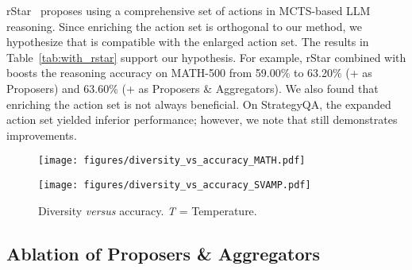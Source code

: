 rStar~\cite{qi2024mutual} proposes using a comprehensive set of actions in MCTS-based LLM reasoning. 
Since enriching the action set is orthogonal to our method, we hypothesize that \mosa{} is compatible with the enlarged action set. 
The results in Table~\ref{tab:with_rstar} support our hypothesis. 
For example, rStar combined with \ourmethod{} boosts the reasoning accuracy on MATH-500 from 59.00\% to 63.20\% (+ \mosa{} as Proposers) and 63.60\% (+ \mosa{} as Proposers \& Aggregators). 
We also found that enriching the action set is not always beneficial. 
On StrategyQA, the expanded action set yielded inferior performance; however, we note that \mosa{} still demonstrates improvements.





\begin{figure}[t]
\vskip 0.2in
\begin{center}

\texttt{[image: figures/diversity\_vs\_accuracy\_MATH.pdf]}

\texttt{[image: figures/diversity\_vs\_accuracy\_SVAMP.pdf]}

\caption{
Diversity \emph{versus} accuracy. \textit{T} = Temperature.
}
\label{fig:diveristy_vs_acc}
\end{center}
\vskip -0.3in
\end{figure}










\subsection{Ablation of Proposers \& Aggregators}
\label{sec:analysis:number_of_pro_agg}

    
